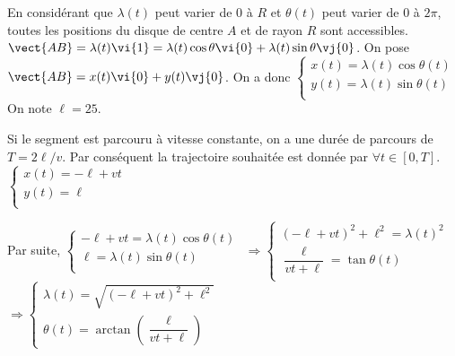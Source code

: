 \begin{corrigebox}
En considérant que $\lambda(t)$ peut varier de 0 à $R$ et $\theta(t)$ peut varier de 0 à $2\pi$, toutes les positions du disque de centre $A$ et de rayon $R$ sont accessibles.
$\vect{AB}=\lambda(t) \vi{1} =\lambda(t) \cos \theta \vi{0} +\lambda(t) \sin \theta \vj{0}$.
On pose $\vect{AB} = x(t)\vi{0}+y(t)\vj{0}$. On a donc 
$\left\{
\begin{array}{l}
x(t) = \lambda(t) \cos \theta(t) \\
y(t) = \lambda(t) \sin \theta(t) \\
\end{array}
\right.$
On note $\ell = 25$. 

Si le segment est parcouru à vitesse constante, on a une durée de parcours de $T = 2\ell / v$. 
Par conséquent la trajectoire souhaitée est donnée par $\forall t \in [0,T]$. 
$\left\{
\begin{array}{l}
x(t) = -\ell+vt \\
y(t) = \ell \\
\end{array}
\right.
$

Par suite,
$\left\{
\begin{array}{l}
-\ell+vt  = \lambda(t) \cos \theta(t) \\
\ell = \lambda(t) \sin \theta(t) \\
\end{array}
\right.$ 
$\Rightarrow 
\left\{
\begin{array}{l}
\left(-\ell+vt\right)^2 + \ell^2   = \lambda(t)^2  \\
\dfrac{\ell}{vt+\ell} =  \tan \theta(t) \\
\end{array}
\right.$ 
$\Rightarrow 
\left\{
\begin{array}{l}
\lambda(t) = \sqrt{\left(-\ell+vt\right)^2 + \ell^2}\\
\theta(t) = \arctan \left( \dfrac{\ell}{vt+\ell} \right)
\end{array}
\right.$
\end{corrigebox}
